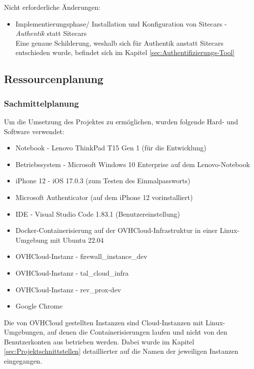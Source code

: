 Nicht erforderliche Änderungen:
\begin{itemize} [label=--]
	\item Implementierungsphase/ Installation und Konfiguration von Sitecars - \textit{Authentik} statt Sitecars
	\\Eine genaue Schilderung, weshalb sich für Authentik anstatt Sitecars entschieden wurde, befindet sich im 
	Kapitel \ref*{sec:Authentifizierungs-Tool} 
\end{itemize}

\subsection{Ressourcenplanung}
\label{sec:Ressourcenplanung}

\subsubsection{Sachmittelplanung}
\label{sec:Sachmittelplanung}
Um die Umsetzung des Projektes zu ermöglichen, wurden folgende Hard- und Software verwendet:
\begin{itemize} [label=--]
	\item Notebook - Lenovo ThinkPad T15 Gen 1 (für die Entwicklung)
	\item Betriebssystem - Microsoft Windows 10 Enterprise auf dem Lenovo-Notebook
	\item iPhone 12 - iOS 17.0.3 (zum Testen des Einmalpassworts)
	\item Microsoft Authenticator (auf dem iPhone 12 vorinstalliert)
	\item \acs{IDE} - Visual Studio Code 1.83.1 (Benutzereinstellung)
	\item Docker-Containerisierung auf der OVHCloud-Infrastruktur in einer Linux-Umgebung mit Ubuntu 22.04
	\item OVHCloud-Instanz - firewall\_instance\_dev
	\item OVHCloud-Instanz - tal\_cloud\_infra
	\item OVHCloud-Instanz - rev\_prox-dev
	\item Google Chrome
\end{itemize}
Die von OVHCloud gestellten Instanzen sind Cloud-Instanzen mit Linux-Umgebungen, auf denen 
die Containerisierungen laufen und nicht von den Benutzerkonten aus betrieben werden. Dabei wurde im Kapitel 
\ref{sec:Projektschnittstellen}  detaillierter auf die Namen der jeweiligen 
Instanzen eingegangen.


